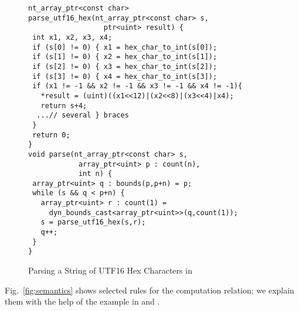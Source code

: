 \begin{figure}[t]
{\small
  \begin{lstlisting}[xleftmargin=4 mm]
nt_array_ptr<const char>
parse_utf16_hex(nt_array_ptr<const char> s,
                  ptr<uint> result) {
 int x1, x2, x3, x4;
 if (s[0] != 0) { x1 = hex_char_to_int(s[0]);
 if (s[1] != 0) { x2 = hex_char_to_int(s[1]);
 if (s[2] != 0) { x3 = hex_char_to_int(s[2]);
 if (s[3] != 0) { x4 = hex_char_to_int(s[3]);
 if (x1 != -1 && x2 != -1 && x3 != -1 && x4 != -1){
   *result = (uint)((x1<<12)|(x2<<8)|(x3<<4)|x4);
   return s+4;
  ...// several } braces
 } 
 return 0;
}
void parse(nt_array_ptr<const char> s,
            array_ptr<uint> p : count(n), 
            int n) {
 array_ptr<uint> q : bounds(p,p+n) = p;
 while (s && q < p+n) {
   array_ptr<uint> r : count(1) =
     dyn_bounds_cast<array_ptr<uint>>(q,count(1));
   s = parse_utf16_hex(s,r);
   q++;
 }
}
  \end{lstlisting}

}

\caption{Parsing a String of UTF16 Hex Characters in \checkedc}
\label{fig:checkedc-example}
\end{figure}




Fig.~\ref{fig:semantics} shows selected rules for the computation
relation; we explain them with the help of the example in  and .

